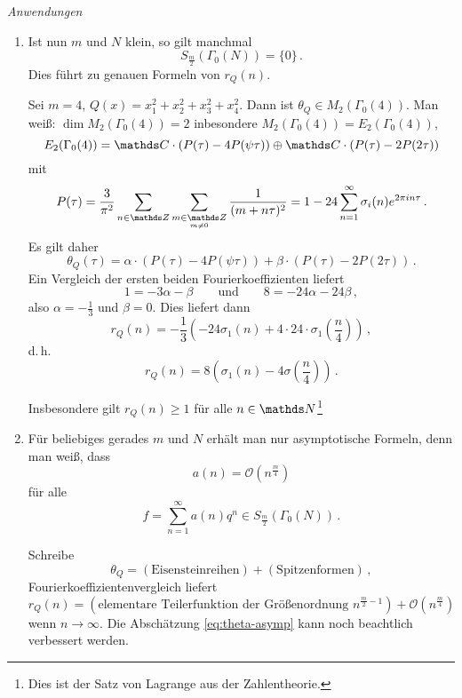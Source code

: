 \emph{Anwendungen}
\begin{enumerate}
\item Ist nun $m$ und $N$ klein, so gilt manchmal
\[
	S_{\frac{m}{2}}(\Gamma_0(N)) = \{0\}
	\,.
\]
Dies führt zu genauen Formeln von $r_Q(n)$.
\begin{bsp}
Sei $m=4$, $Q(x) = x_1^2+x_2^2+x_3^2+x_4^2$.
Dann ist $\theta_Q \in M_2(\Gamma_0(4))$.
Man weiß: $\dim M_2(\Gamma_0(4)) = 2$ inbesondere $M_2(\Gamma_0(4)) = E_2(\Gamma_0(4))$,
\[
	E_2(\Gamma_0(4)) = \CC\cdot(P(\tau) - 4P(\psi\tau)) \oplus \CC\cdot(P(\tau) - 2P(2\tau))
\]
mit
\[
	P(\tau)
	= \frac{3}{\pi^2} \sum_{n\in\ZZ} \sum_{\substack{m\in\ZZ\\ \scriptscriptstyle m\not=0}} \frac{1}{(m+n\tau)^2}
	= 1 - 24 \sum_{n=1}^\infty \sigma_i(n) e^{2\pi i n\tau}
	\,.
\]
Es gilt daher
\[
	\theta_Q(\tau)
	= \alpha\cdot(P(\tau) - 4P(\psi\tau)) + \beta\cdot(P(\tau) - 2P(2\tau))
	\,.
\]
Ein Vergleich der ersten beiden Fourierkoeffizienten liefert
\[
	1
	= -3\alpha - \beta
	\qquad\text{und} \qquad
	8 = -24\alpha - 24\beta
	\,,
\]
also $\alpha = -\frac{1}{3}$ und $\beta = 0$.
Dies liefert dann
\[
	r_Q(n)
	= - \frac{1}{3} \left(-24\sigma_1(n) + 4\cdot24\cdot\sigma_1\left(\frac{n}{4}\right)\right)
	\,,
\]
d.\,h.
\[
	r_Q(n)
	= 8 \left(\sigma_1(n) - 4\sigma\left(\frac{n}{4}\right)\right)
	\,.
\]

Insbesondere gilt $r_Q(n) \geq 1$ für alle $n\in \NN$\footnote{Dies ist der Satz von Lagrange aus der Zahlentheorie.}
\end{bsp}

\item Für beliebiges gerades $m$ und $N$ erhält man nur asymptotische Formeln, denn man weiß, dass
\begin{equation}\label{eq:theta-asymp}
	a(n) = \mathcal O(n^{\frac{m}{4}})
\end{equation}
für alle
\[
	f
	= \sum_{n=1}^\infty a(n)q^n \in S_{\frac{m}{2}}(\Gamma_0(N))
	\,.
\]

Schreibe
\[
	\theta_Q
	= (\text{Eisensteinreihen}) + (\text{Spitzenformen})
	\,,
\]
Fourierkoeffizientenvergleich liefert
\[
	r_Q(n) = (\text{elementare Teilerfunktion der Größenordnung } n^{\frac{m}{2}-1}) + \mathcal O (n^{\frac{m}{4}})
\]
wenn $n \to \infty$. Die Abschätzung \eqref{eq:theta-asymp} kann noch beachtlich verbessert werden.
\end{enumerate}
